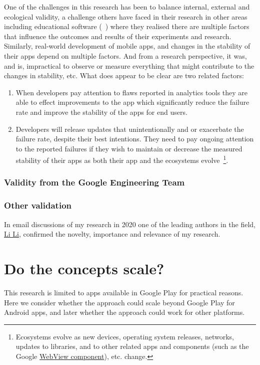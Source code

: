 One of the challenges in this research has been to balance internal, external and ecological validity, a challenge others have faced in their research in other areas including educational software (~\cite{ransdell1993educational_software_evaluation_research_validities}) where they realised there are multiple factors that influence the outcomes and results of their experiments and research. Similarly, real-world development of mobile apps, and changes in the stability of their apps depend on multiple factors. And from a research perspective, it was, and is, impractical to observe or measure everything that might contribute to the changes in stability, etc. What does appear to be clear are two related factors:

\begin{enumerate}
    \item When developers pay attention to flaws reported in analytics tools they are able to effect improvements to the app which significantly reduce the failure rate and improve the stability of the apps for end users.
    \item Developers will release updates that unintentionally and or exacerbate the failure rate, despite their best intentions. They need to pay ongoing attention to the reported failures if they wish to maintain or decrease the measured stability of their apps as both their app and the ecosystems evolve~\footnote{Ecosystems evolve as new devices, operating system releases, networks, updates to libraries, and to other related apps and components (such as the Google \href{ection-webview-component}{WebView component}), etc. change.}.
\end{enumerate}

\subsubsection{Validity from the Google Engineering Team}



\subsubsection{Other validation}
In email discussions of my research in 2020 one of the leading authors in the field, \href{https://scholar.google.com/citations?user=zuUsFkgAAAAJ&hl=en&oi=sra}{Li Li}, confirmed the novelty, importance and relevance of my research.



\section{Do the concepts scale?}
This research is limited to apps available in Google Play for practical reasons. Here we consider whether the approach could scale beyond Google Play for Android apps, and later whether the approach could work for other platforms.

